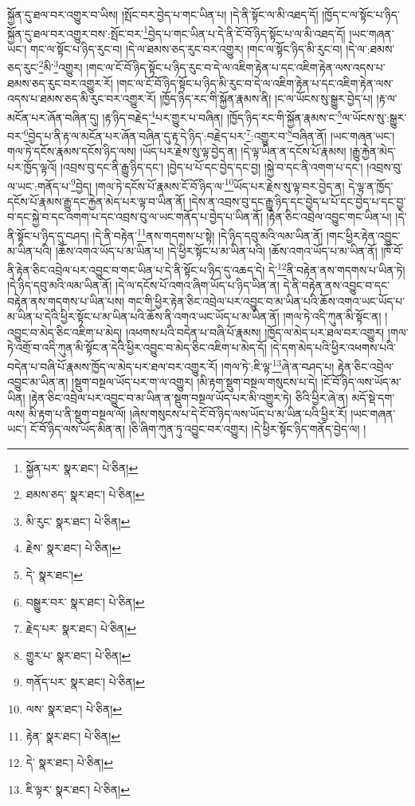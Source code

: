སྐྱོན་དུ་ཐལ་བར་འགྱུར་བ་ཡིས། །སྤོང་བར་བྱེད་པ་གང་ཡིན་པ། །དེ་ནི་སྟོང་ལ་མི་འཐད་དོ། །ཁྱོད་ང་ལ་སྟོང་པ་ཉིད་སྐྱོན་དུ་ཐལ་བར་འགྱུར་བས་:སྤོང་བར་\footnote{སྐྱོན་པར་  སྣར་ཐང་།  པེ་ཅིན། }བྱེད་པ་གང་ཡིན་པ་དེ་ནི་ངོ་བོ་ཉིད་སྟོང་པ་ལ་མི་འཐད་དོ། །ཡང་གཞན་ཡང་། གང་ལ་སྟོང་པ་ཉིད་རུང་བ། །དེ་ལ་ཐམས་ཅད་རུང་བར་འགྱུར། །གང་ལ་སྟོང་ཉིད་མི་རུང་བ། །དེ་ལ་:ཐམས་ཅད་རུང་\footnote{ཐམས་ཅད་  སྣར་ཐང་།  པེ་ཅིན། }མི་\footnote{མི་རུང་  སྣར་ཐང་།  པེ་ཅིན། }འགྱུར། །གང་ལ་ངོ་བོ་ཉིད་སྟོང་པ་ཉིད་རུང་བ་དེ་ལ་འཇིག་རྟེན་པ་དང་འཇིག་རྟེན་ལས་འདས་པ་ཐམས་ཅད་རུང་བར་འགྱུར་རོ། །གང་ལ་ངོ་བོ་ཉིད་སྟོང་པ་ཉིད་མི་རུང་བ་དེ་ལ་འཇིག་རྟེན་པ་དང་འཇིག་རྟེན་ལས་འདས་པ་ཐམས་ཅད་མི་རུང་བར་འགྱུར་རོ། །ཁྱོད་ཉིད་རང་གི་སྐྱོན་རྣམས་ནི། །ང་ལ་ཡོངས་སུ་སྒྱུར་བྱེད་པ། །རྟ་ལ་མངོན་པར་ཞོན་བཞིན་དུ། །རྟ་ཉིད་བརྗེད་\footnote{རྗེས་  སྣར་ཐང་།  པེ་ཅིན། }པར་གྱུར་པ་བཞིན། །ཁྱོད་ཉིད་རང་གི་སྐྱོན་རྣམས་ང་\footnote{དེ་  སྣར་ཐང་། }ལ་ཡོངས་སུ་:སྒྱུར་བར་\footnote{བསྒྱུར་བར་  སྣར་ཐང་།  པེ་ཅིན། }བྱེད་པ་ནི་རྟ་ལ་མངོན་པར་ཞོན་བཞིན་དུ་རྟ་དེ་ཉིད་:བརྗེད་པར་\footnote{རྗེད་པར་  སྣར་ཐང་།  པེ་ཅིན། }:འགྱུར་བ་\footnote{གྱུར་པ་  སྣར་ཐང་།  པེ་ཅིན། }བཞིན་ནོ། །ཡང་གཞན་ཡང་། གལ་ཏེ་དངོས་རྣམས་དངོས་ཉིད་ལས། །ཡོད་པར་རྗེས་སུ་ལྟ་བྱེད་ན། །དེ་ལྟ་ཡིན་ན་དངོས་པོ་རྣམས། །རྒྱུ་རྐྱེན་མེད་པར་ཁྱོད་ལྟའོ། །འབྲས་བུ་དང་ནི་རྒྱུ་ཉིད་དང་། །བྱེད་པ་པོ་དང་བྱེད་དང་བྱ། །སྐྱེ་བ་དང་ནི་འགག་པ་དང་། །འབྲས་བུ་ལ་ཡང་:གནོད་པ་\footnote{གནོད་པར་  སྣར་ཐང་།  པེ་ཅིན། }བྱེད། །གལ་ཏེ་དངོས་པོ་རྣམས་ངོ་བོ་ཉིད་ལ་\footnote{ལས་  སྣར་ཐང་།  པེ་ཅིན། }ཡོད་པར་རྗེས་སུ་ལྟ་བར་བྱེད་ན། དེ་ལྟ་ན་ཁྱོད་དངོས་པོ་རྣམས་རྒྱུ་དང་རྐྱེན་མེད་པར་ལྟ་བ་ཡིན་ནོ། །དེས་ན་འབྲས་བུ་དང་རྒྱུ་ཉིད་དང་བྱེད་པ་པོ་དང་བྱེད་པ་དང་བྱ་བ་དང་སྐྱེ་བ་དང་འགག་པ་དང་འབྲས་བུ་ལ་ཡང་གནོད་པ་བྱེད་པ་ཡིན་ནོ། །རྟེན་ཅིང་འབྲེལ་འབྱུང་གང་ཡིན་པ། །དེ་ནི་སྟོང་པ་ཉིད་དུ་བཤད། །དེ་ནི་བརྟེན་\footnote{རྟེན་  སྣར་ཐང་།  པེ་ཅིན། }ནས་གདགས་པ་སྟེ། །དེ་ཉིད་དབུ་མའི་ལམ་ཡིན་ནོ། །གང་ཕྱིར་རྟེན་འབྱུང་མ་ཡིན་པའི། །ཆོས་འགའ་ཡོད་པ་མ་ཡིན་པ། །དེ་ཕྱིར་སྟོང་པ་མ་ཡིན་པའི། །ཆོས་འགའ་ཡོད་པ་མ་ཡིན་ནོ། །ཁོ་བོ་ནི་རྟེན་ཅིང་འབྲེལ་པར་འབྱུང་བ་གང་ཡིན་པ་དེ་ནི་སྟོང་པ་ཉིད་དུ་འཆད་དེ། དེ་\footnote{དེ་  སྣར་ཐང་།  པེ་ཅིན། }ནི་བརྟེན་ནས་གདགས་པ་ཡིན་ཏེ། །དེ་ཉིད་དབུ་མའི་ལམ་ཡིན་ནོ། །དེ་ལ་དངོས་པོ་འགའ་ཞིག་ཡོད་པ་ཉིད་ཡིན་ན། དེ་ནི་བརྟེན་ནས་འབྱུང་བ་དང་བརྟེན་ནས་གདགས་པ་ཡིན་པས། གང་གི་ཕྱིར་རྟེན་ཅིང་འབྲེལ་པར་འབྱུང་བ་མ་ཡིན་པའི་ཆོས་འགའ་ཡང་ཡོད་པ་མ་ཡིན་པ་དེའི་ཕྱིར་སྟོང་པ་མ་ཡིན་པའི་ཆོས་ནི་འགའ་ཡང་ཡོད་པ་མ་ཡིན་ནོ། །གལ་ཏེ་འདི་ཀུན་མི་སྟོང་ན། །འབྱུང་བ་མེད་ཅིང་འཇིག་པ་མེད། །འཕགས་པའི་བདེན་པ་བཞི་པོ་རྣམས། །ཁྱོད་ལ་མེད་པར་ཐལ་བར་འགྱུར། །གལ་ཏེ་འགྲོ་བ་འདི་ཀུན་མི་སྟོང་ན་དེའི་ཕྱིར་འབྱུང་བ་མེད་ཅིང་འཇིག་པ་མེད་དོ། །དེ་དག་མེད་པའི་ཕྱིར་འཕགས་པའི་བདེན་པ་བཞི་པོ་རྣམས་ཁྱོད་ལ་མེད་པར་ཐལ་བར་འགྱུར་རོ། །གལ་ཏེ་:ཇི་ལྟ་\footnote{ཇི་ལྟར་  སྣར་ཐང་།  པེ་ཅིན། }ཞེ་ན་བཤད་པ། རྟེན་ཅིང་འབྲེལ་འབྱུང་མ་ཡིན་ན། །སྡུག་བསྔལ་ཡོད་པར་ག་ལ་འགྱུར། །མི་རྟག་སྡུག་བསྔལ་གསུངས་པ་དེ། །ངོ་བོ་ཉིད་ལས་ཡོད་མ་ཡིན། །རྟེན་ཅིང་འབྲེལ་པར་འབྱུང་བ་མ་ཡིན་ན་སྡུག་བསྔལ་ཡོད་པར་མི་འགྱུར་ཏེ། ཅིའི་ཕྱིར་ཞེ་ན། མདོ་སྡེ་དག་ལས། མི་རྟག་པ་ནི་སྡུག་བསྔལ་ལོ། །ཞེས་གསུངས་པ་དེ་ངོ་བོ་ཉིད་ལས་ཡོད་པ་མ་ཡིན་པའི་ཕྱིར་རོ། །ཡང་གཞན་ཡང་། ངོ་བོ་ཉིད་ལས་ཡོད་མིན་ན། །ཅི་ཞིག་ཀུན་ཏུ་འབྱུང་བར་འགྱུར། །དེ་ཕྱིར་སྟོང་ཉིད་གནོད་བྱེད་ལ། །

